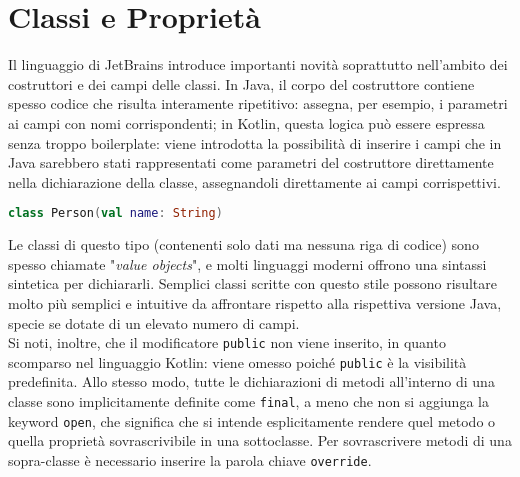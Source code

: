 \section{Classi e Proprietà}
Il linguaggio di JetBrains introduce importanti novità soprattutto nell’ambito dei costruttori e dei campi delle classi. In Java, il corpo del costruttore contiene spesso codice che risulta interamente ripetitivo: assegna, per esempio, i parametri ai campi con nomi corrispondenti; in Kotlin, questa logica può essere espressa senza troppo boilerplate: viene introdotta la possibilità di inserire i campi che in Java sarebbero stati rappresentati come parametri del costruttore direttamente nella dichiarazione della classe, assegnandoli direttamente ai campi corrispettivi.\\

\begin{lstlisting}[caption={Classe \texttt{Person} con una proprietà \texttt{name}}, captionpos=b, label={lst:exampleClassDeclaration}, language=Kotlin]
class Person(val name: String)
\end{lstlisting}

Le classi di questo tipo (contenenti solo dati ma nessuna riga di codice) sono spesso
chiamate "{\em value objects}", e molti linguaggi moderni offrono una sintassi sintetica per dichiararli.
Semplici classi scritte con questo stile possono risultare molto più semplici e intuitive da affrontare rispetto alla rispettiva versione Java, specie se dotate di un elevato numero di campi.\\
Si noti, inoltre, che il modificatore \texttt{public} non viene inserito, in quanto scomparso nel linguaggio Kotlin: viene omesso poiché \texttt{public} è la visibilità predefinita. Allo stesso modo, tutte le dichiarazioni di metodi all’interno di una classe sono implicitamente definite come \texttt{final}, a meno che non si aggiunga la keyword \texttt{open}, che significa che si intende esplicitamente rendere quel metodo o quella proprietà sovrascrivibile in una sottoclasse. Per sovrascrivere metodi di una sopra-classe è necessario inserire la parola chiave \texttt{override}.\\

